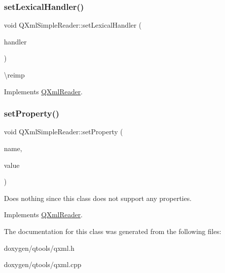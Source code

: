 \mbox{\label{class_q_xml_simple_reader_ad8788962913e2eaeaf18a8124fb1b770}} 
\subsubsection{\texorpdfstring{setLexicalHandler()}{setLexicalHandler()}}
{\footnotesize\ttfamily void Q\+Xml\+Simple\+Reader\+::set\+Lexical\+Handler (\begin{DoxyParamCaption}\item[{\mbox{\hyperlink{class_q_xml_lexical_handler}{Q\+Xml\+Lexical\+Handler}} $\ast$}]{handler }\end{DoxyParamCaption})\hspace{0.3cm}{\ttfamily [virtual]}}

\textbackslash{}reimp 

Implements \mbox{\hyperlink{class_q_xml_reader_ab38c3816bacd14e3efcb8a5e0e5630be}{Q\+Xml\+Reader}}.

\mbox{\label{class_q_xml_simple_reader_abd76c9f09aac5584602b7dd440a9074a}} 
\subsubsection{\texorpdfstring{setProperty()}{setProperty()}}
{\footnotesize\ttfamily void Q\+Xml\+Simple\+Reader\+::set\+Property (\begin{DoxyParamCaption}\item[{const \mbox{\hyperlink{class_q_string}{Q\+String}} \&}]{name,  }\item[{void $\ast$}]{value }\end{DoxyParamCaption})\hspace{0.3cm}{\ttfamily [virtual]}}

Does nothing since this class does not support any properties. 

Implements \mbox{\hyperlink{class_q_xml_reader_aa02ae81ff9636b9961bc333a68ecffa4}{Q\+Xml\+Reader}}.



The documentation for this class was generated from the following files\+:\begin{DoxyCompactItemize}
\item 
doxygen/qtools/qxml.\+h\item 
doxygen/qtools/qxml.\+cpp\end{DoxyCompactItemize}
